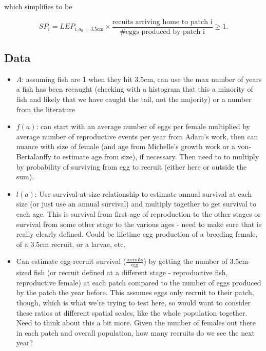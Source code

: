 \documentclass[12pt, oneside]{article}   	%
\begin{document}
which simplifies to be

\begin{equation}
SP_i = LEP_{i, \text{$a_0$ = 3.5cm}} \times \frac{\text{recuits arriving home to patch i}}{\# \text{eggs produced by patch i}} \geq 1. %
\end{equation}


\subsection*{Data}
\begin{itemize}
\item $A$: assuming fish are 1 when they hit 3.5cm, can use the max number of years a fish has been recaught (checking with a histogram that this a minority of fish and likely that we have caught the tail, not the majority) or a number from the literature
\item $f(a)$: can start with an average number of eggs per female multiplied by average number of reproductive events per year from Adam's work, then can nuance with size of female (and age from Michelle's growth work or a von-Bertalanffy to estimate age from size), if necessary. Then need to to multiply by probability of surviving from egg to recruit (either here or outside the sum). %
\item $l(a)$: Use survival-at-size relationship to estimate annual survival at each size (or just use an annual survival) and multiply together to get survival to each age. This is survival from first age of reproduction to the other stages or survival from some other stage to the various ages - need to make sure that is really clearly defined. Could be lifetime egg production of a breeding female, of a 3.5cm recruit, or a larvae, etc.
\item Can estimate egg-recruit survival ($\frac{\text{recruits}}{\text{egg}}$) by getting the number of 3.5cm-sized fish (or recruit defined at a different stage - reproductive fish, reproductive female) at each patch compared to the number of eggs produced by the patch the year before. This assumes eggs only recruit to their patch, though, which is what we're trying to test here, so would want to consider these ratios at different spatial scales, like the whole population together. Need to think about this a bit more. Given the number of females out there in each patch and overall population, how many recruits do we see the next year?
\end{itemize}
\end{document}

